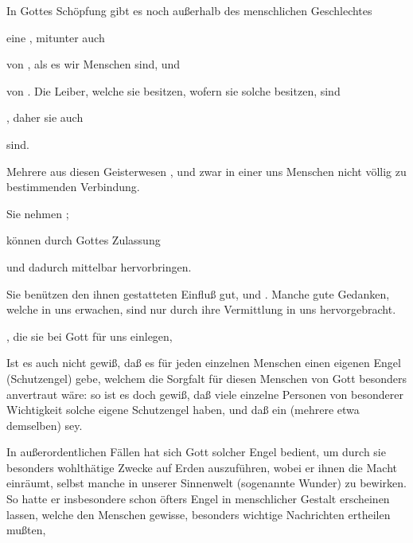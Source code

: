 \begin{aufza}
\item In Gottes Schöpfung gibt es noch außerhalb des menschlichen Geschlechtes
\begin{aufzb}
\item eine , mitunter auch
\item von , als es wir Menschen sind, und~
\item von . Die Leiber, welche sie besitzen, wofern sie solche besitzen, sind
\item {}, daher sie auch
\item {} sind.
\end{aufzb}
\item Mehrere aus diesen Geisterwesen , und zwar in einer uns Menschen nicht völlig zu bestimmenden Verbindung.
\begin{aufzb}
\item Sie nehmen ;
\item können durch Gottes Zulassung 
\item und dadurch mittelbar  hervorbringen.
\item Sie benützen den ihnen gestatteten Einfluß  gut, und . Manche gute Gedanken, welche in uns erwachen, sind nur durch ihre Vermittlung in uns hervorgebracht.
\item {}, die sie bei Gott für uns einlegen, 
\item Ist es auch nicht gewiß, daß es für jeden einzelnen Menschen einen eigenen Engel (Schutzengel) gebe, welchem die Sorgfalt für diesen Menschen von Gott besonders anvertraut wäre: so ist es doch gewiß, daß viele einzelne Personen von besonderer Wichtigkeit solche eigene Schutzengel haben, und daß ein  (mehrere etwa demselben)  sey.
\item In außerordentlichen Fällen hat sich Gott solcher Engel bedient, um durch sie besonders wohlthätige Zwecke auf Erden auszuführen, wobei er ihnen die Macht einräumt, selbst manche  in unserer Sinnenwelt (sogenannte Wunder) zu bewirken. So hatte er insbesondere schon öfters Engel in menschlicher Gestalt erscheinen lassen, welche den Menschen gewisse, besonders wichtige Nachrichten ertheilen mußten, \usw~

\end{aufzb}
\end{aufza}
